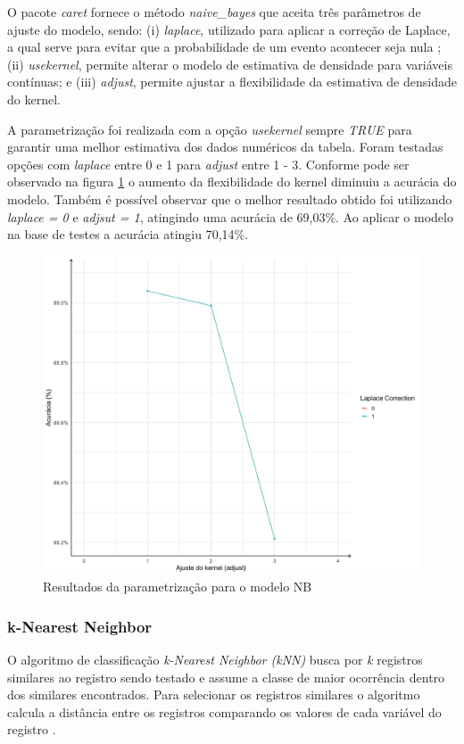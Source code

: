 \documentclass[12pt]{article}
\begin{document}
O pacote \textit{caret} fornece o método \textit{naive\_bayes} que aceita três parâmetros de ajuste do modelo, sendo: (i) \textit{laplace}, utilizado para aplicar a correção de Laplace, a qual serve para evitar que a probabilidade de um evento acontecer seja nula \cite{lantz:mlinR, caret:r}; (ii) \textit{usekernel}, permite alterar o modelo de estimativa de densidade para variáveis contínuas; e (iii) \textit{adjust}, permite ajustar a flexibilidade da estimativa de densidade do kernel.

A parametrização foi realizada com a opção \textit{usekernel} sempre \textit{TRUE} para garantir uma melhor estimativa dos dados numéricos da tabela. Foram testadas opções com \textit{laplace} entre 0 e 1 para \textit{adjust} entre 1 - 3. Conforme pode ser observado na figura \ref{fig:nb_resultados} o aumento da flexibilidade do kernel diminuiu a acurácia do modelo. Também é possível observar que o melhor resultado obtido foi utilizando \textit{laplace = 0} e \textit{adjsut = 1}, atingindo uma acurácia de 69,03\%. Ao aplicar o modelo na base de testes a acurácia atingiu 70,14\%.

\begin{figure}[ht]
\centering
\includegraphics[width=.8\textwidth]{nb_resultados.png}
\caption{Resultados da parametrização para o modelo NB}
\label{fig:nb_resultados}
\end{figure}

\subsubsection{k-Nearest Neighbor}

O algoritmo de classificação \textit{k-Nearest Neighbor (kNN)} busca por \textit{k} registros similares ao registro sendo testado e assume a classe de maior ocorrência dentro dos similares encontrados. Para selecionar os registros similares o algoritmo calcula a distância entre os registros comparando os valores de cada variável do registro  \cite{lantz:mlinR}.
\end{document}
